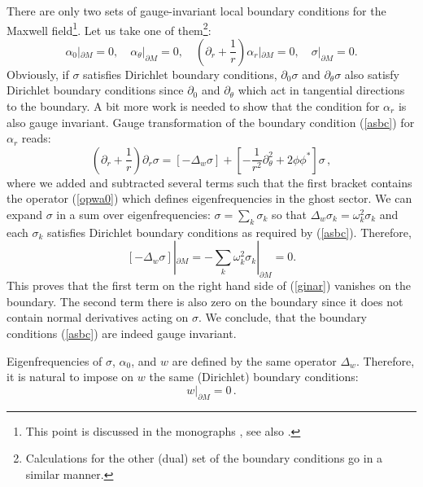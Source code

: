 \documentclass[a4paper,12pt]{article}
\begin{document}
There are only two sets of gauge-invariant local boundary conditions
for the Maxwell field\footnote{This point is discussed in the monographs
\cite{Gilkey:1995,EKP}, see also \cite{Vassilevich:1994cz}.
}. Let us take one of them\footnote{Calculations for the other (dual)
set of the boundary conditions go in a similar manner.}:
\begin{equation}
\alpha_0|_{\partial M}=0,\quad
\alpha_\theta |_{\partial M}=0,\quad
\left( \partial_r +\frac 1r \right) \alpha_r |_{\partial M}=0,\quad
\sigma |_{\partial M}=0.\label{asbc}
\end{equation}
Obviously, if $\sigma$ satisfies Dirichlet boundary conditions,
$\partial_0 \sigma$ and $\partial_\theta \sigma$ also satisfy
Dirichlet boundary conditions since $\partial_0$ and $\partial_\theta$
which act in tangential directions to the boundary. 
A bit more work is needed to show that the
condition for $\alpha_r $ is also gauge invariant. 
Gauge transformation of the boundary condition (\ref{asbc})
for $\alpha_r$ reads:
\begin{equation}
\left( \partial_r +\frac 1r \right) \partial_r \sigma =
\left[ -\Delta_w \sigma \right] +
\left[ - \frac 1{r^2}\partial_\theta^2 + 2\phi\phi^* \right]\sigma
\,,\label{ginar}
\end{equation}
where we added and subtracted several terms such that the first
bracket contains the operator (\ref{opwa0}) which defines eigenfrequencies
in the ghost sector. We can expand $\sigma$ in a sum over eigenfrequencies:
$\sigma =\sum_k \sigma_k$ so that 
$\Delta_w \sigma_k=\omega_k^2\sigma_k$ and each $\sigma_k$
satisfies Dirichlet boundary conditions as required by (\ref{asbc}).
Therefore,
\begin{equation}
\left[ -\Delta_w \sigma \right]|_{\partial M} =
-\sum_k \omega_k^2 \sigma_k |_{\partial M} =0.\label{1stterm}
\end{equation}
This proves that the first term on the right hand side of (\ref{ginar})
vanishes on the boundary. The second term there is also zero on the
boundary since it does not contain normal derivatives acting on 
$\sigma$. We conclude, that the boundary conditions (\ref{asbc})
are indeed gauge invariant. 

Eigenfrequencies of $\sigma$, $\alpha_0$, and $w$ are defined by
the same operator $\Delta_w$. Therefore, it is natural to impose
on $w$ the same (Dirichlet) boundary conditions:
\begin{equation}
w|_{\partial M}=0 \,.\label{bcw}
\end{equation}  
\end{document}
